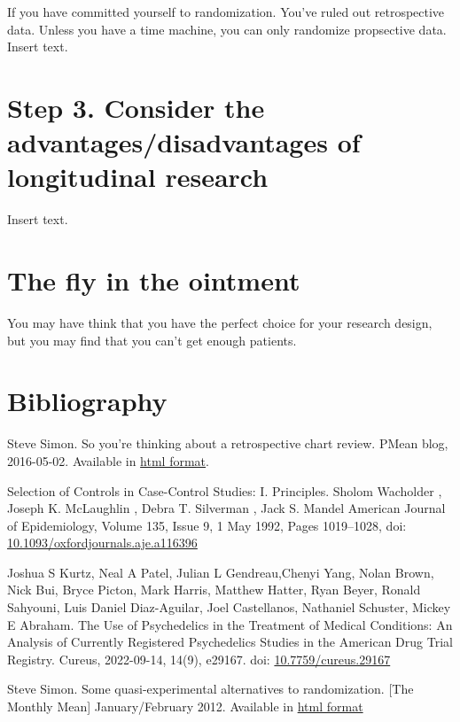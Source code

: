 \documentclass[
  letterpaper,
  DIV=11,
  numbers=noendperiod]{scrreprt}
\begin{document}
If you have committed yourself to randomization. You've ruled out
retrospective data. Unless you have a time machine, you can only
randomize propsective data. Insert text.

\section{Step 3. Consider the advantages/disadvantages of longitudinal
research}\label{step-3.-consider-the-advantagesdisadvantages-of-longitudinal-research}

Insert text.

\section{The fly in the ointment}\label{the-fly-in-the-ointment-1}

You may have think that you have the perfect choice for your research
design, but you may find that you can't get enough patients.

\section{Bibliography}\label{bibliography-3}

Steve Simon. So you're thinking about a retrospective chart review.
PMean blog, 2016-05-02. Available in
\href{http://blog.pmean.com/chart-review/}{html format}.

Selection of Controls in Case-Control Studies: I. Principles. Sholom
Wacholder , Joseph K. McLaughlin , Debra T. Silverman , Jack S. Mandel
American Journal of Epidemiology, Volume 135, Issue 9, 1 May 1992, Pages
1019--1028, doi:
\href{https://doi.org/10.1093/oxfordjournals.aje.a116396}{10.1093/oxfordjournals.aje.a116396}

Joshua S Kurtz, Neal A Patel, Julian L Gendreau,Chenyi Yang, Nolan
Brown, Nick Bui, Bryce Picton, Mark Harris, Matthew Hatter, Ryan Beyer,
Ronald Sahyouni, Luis Daniel Diaz-Aguilar, Joel Castellanos, Nathaniel
Schuster, Mickey E Abraham. The Use of Psychedelics in the Treatment of
Medical Conditions: An Analysis of Currently Registered Psychedelics
Studies in the American Drug Trial Registry. Cureus, 2022-09-14, 14(9),
e29167. doi:
\href{https://doi.org/10.7759/cureus.29167}{10.7759/cureus.29167}

Steve Simon. Some quasi-experimental alternatives to randomization.
{[}The Monthly Mean{]} January/February 2012. Available in
\href{http://pmean.com/posts/pesky-tabs/}{html format}
\end{document}
